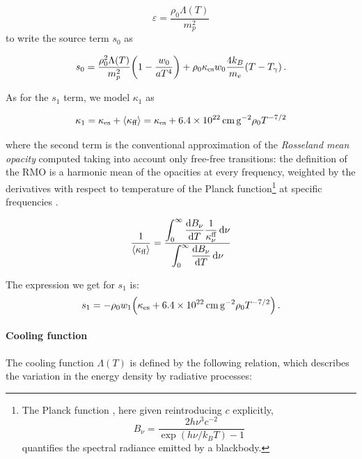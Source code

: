 \documentclass[main.tex]{subfiles}
\begin{document}
\begin{equation}
    \varepsilon = \frac{\rho_0 \Lambda (T)}{m_p^2}
\end{equation}
to write the source term \(s_0\) as

\begin{equation}
    s_0 = \frac{\rho_0^2 \Lambda (T)}{m_p^2} \qty(1 - \frac{w_0}{aT^4}) + \rho_0 \kappa_{\text{es}} w_0 \frac{4 k_B}{m_e} (T - T_\gamma)\,.
\end{equation}

As for the \(s_1\) term, we model \(\kappa_1\) as

\begin{equation}
  \kappa_1 = \kappa_{\text{es}} + \expval{\kappa_{\text{ff}}}
  = \kappa_{\text{es}} + \SI{6.4e22}{\centi\metre\square\per\gram} \rho_0 T^{-7/2}
\end{equation}

where the second term is the conventional approximation of the \emph{Rosseland mean opacity} computed taking into account only free-free transitions: the definition of the RMO is a harmonic mean of the opacities at every frequency, weighted by the derivatives with respect to temperature of the Planck function\footnote{The Planck function \cite[eq. 1.51]{RybickiLightman:2004}, here given reintroducing \(c\) explicitly,
\[
B_\nu = \frac{2h \nu^3 c^{-2}}{\exp(h\nu / k_B T) - 1}
\]
quantifies the spectral radiance emitted by a blackbody.
}
at specific frequencies \cite[eq. 1.110]{RybickiLightman:2004}.

\begin{equation}
  \frac{1}{\expval{\kappa_{\text{ff}}}} =
  \frac{ \displaystyle\int _{0}   ^{\infty}  \dv{B_\nu}{T} \frac{1}{\kappa_\nu^{\text{ff}}} \dd{\nu}}
  {  \displaystyle \int _{0}   ^{\infty} \dv{B_\nu}{T} \dd{\nu}}
\end{equation}

The expression we get for \(s_1\) is:
\begin{equation}
  s_1 = - \rho_0 w_1 \qty(\kappa_{\text{es}} + \SI{6.4e22}{\centi\metre\square\per\gram} \rho_0 T^{-7/2}) \,.
\end{equation}

\paragraph{Cooling function}

The cooling function \(\Lambda (T)\) is defined by the following relation, which describes the variation in the energy density by radiative processes:
\end{document}

